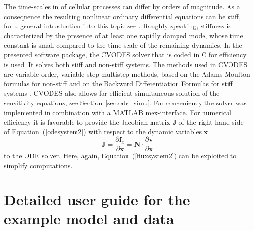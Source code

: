\documentclass[12pt,a4paper]{scrartcl}
\newcommand{\dd}[2]{\frac{\partial #1}{\partial #2}}
\begin{document}
The time-scales in of cellular processes can differ by orders of magnitude. As a consequence the resulting 
nonlinear ordinary differential equations can be stiff, for a general introduction into this topic see 
\citet{Lambert:1977fk}. Roughly speaking, stiffness is characterized by the presence of at least one rapidly 
damped mode, whose time constant is small compared to the time scale of the remaining dynamics. In the 
presented software package, the CVODES solver \citep{Hindmarsh:2005fb} that is coded in C for efficiency 
is used. It solves both stiff and non-stiff systems. The methods used in CVODES are variable-order, 
variable-step multistep methods, based on the Adams-Moulton formulas for non-stiff and on the Backward 
Differentiation Formulas for stiff systems \citep{Byrne:1975uq}. CVODES also allows for efficient 
simultaneous solution of the sensitivity equations, see Section~\ref{sec:ode_simu}. For conveniency the 
solver was implemented in combination with a MATLAB mex-interface. For numerical efficiency it is 
favorable to provide the Jacobian matrix $\mathbf{J}$ of the right hand side of Equation~(\ref{odesystem2}) 
with respect to the dynamic variables $\mathbf{x}$ 
\begin{equation}
	\mathbf{J} = \dd{\mathbf{f}_{x}}{\mathbf{x}} = \mathbf{N} \cdot \dd{\mathbf{v}}{\mathbf{x}}
\label{jac_mat}
\end{equation}
to the ODE solver. Here, again, Equation~(\ref{fluxsystem2}) can be exploited to simplify computations.

\section{Detailed user guide for the \citet{Raia:2011vn} example model and data} \label{user_guide}
\end{document}
